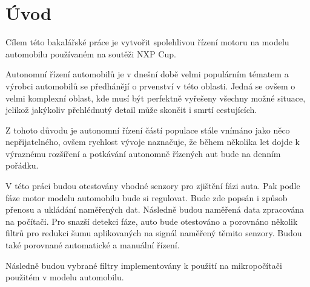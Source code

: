 \chapter{Úvod}
\label{sec:Introduction}
Cílem této bakalářské práce je vytvořit spolehlivou řízení motoru na modelu
automobilu používaném na soutěži NXP Cup.

Autonomní řízení automobilů je v dnešní době velmi populárním tématem a výrobci automobilů
se předhánějí o prvenství v této oblasti. Jedná se ovšem o velmi komplexní oblast, kde
musí být perfektně vyřešeny všechny možné situace, jelikož jakýkoliv přehlédnutý detail může
skončit i smrtí cestujících.

Z tohoto důvodu je autonomní řízení částí populace stále vnímáno jako něco nepřijatelného,
ovšem rychlost vývoje naznačuje, že během několika let dojde k výraznému rozšíření a potkávání
autonomně řízených aut bude na denním pořádku.

V této práci budou otestovány vhodné senzory pro zjištění fázi auta. Pak podle fáze motor modelu automobilu bude si regulovat.
Bude zde popsán i způsob přenosu a ukládání naměřených dat. Následně budou naměřená data zpracována na počítači.
Pro snazší detekci fáze, auto bude otestováno a porovnáno několik filtrů pro redukci šumu aplikovaných na signál naměřený těmito senzory.
Budou také porovnané automatické a manuální řízení.

Následně budou vybrané filtry implementovány k použití na mikropočítači použitém v modelu automobilu.
\endinput
